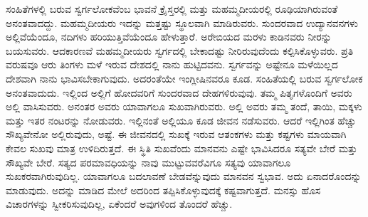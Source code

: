 ಸಂಹಿತೆಗಳಲ್ಲಿ ಬರುವ ಸ್ವರ್ಗಲೋಕವೆಂಬ ಭಾವನೆ ಕ್ರೈಸ್ತರಲ್ಲಿ ಮತ್ತು ಮಹಮ್ಮದೀಯರಲ್ಲಿ ರೂಢಿಯಾಗಿರುವಂತೆ ಅನಂತವಾದದ್ದು. ಮಹಮ್ಮದೀಯರು ಇದನ್ನು ಮತ್ತಷ್ಟು ಸ್ಥೂಲವಾಗಿ ಮಾಡಿರುವರು. ಸುಂದರವಾದ ಉದ್ಯಾನವನಗಳು ಅಲ್ಲಿವೆಯೆಂದೂ, ನದಿಗಳು ಹರಿಯುತ್ತಿವೆಯೆಂದೂ ಹೇಳುತ್ತಾರೆ. ಅರೇಬಿಯದ ಮರಳು ಕಾಡಿನವರು ನೀರನ್ನು ಬಯಸುವರು. ಆದಕಾರಣವೆ ಮಹಮ್ಮದೀಯರು ಸ್ವರ್ಗದಲ್ಲಿ ಬೇಕಾದಷ್ಟು ನೀರಿರುವುದೆಂದು ಕಲ್ಪಿಸಿಕೊಳ್ಳುವರು. ಪ್ರತಿ ವರುಷವೂ ಆರು ತಿಂಗಳು ಮಳೆ ಇರುವ ದೇಶದಲ್ಲಿ ನಾನು ಹುಟ್ಟಿದವನು. ಸ್ವರ್ಗವನ್ನು ಅಷ್ಟೇನೂ ಮಳೆಯಿಲ್ಲದ ದೇಶವಾಗಿ ನಾನು ಭಾವಿಸಬೇಕಾಗುವುದು. ಅದರಂತೆಯೇ ಇಂಗ್ಲೀಷಿನವರೂ ಕೂಡ. ಸಂಹಿತೆಯಲ್ಲಿ ಬರುವ ಸ್ವರ್ಗಲೋಕ ಅನಂತವಾದುದು. ಇಲ್ಲಿಂದ ಅಲ್ಲಿಗೆ ಹೋದವರಿಗೆ ಸುಂದರವಾದ ದೇಹಗಳಿರುವುವು. ತಮ್ಮ ಪಿತೃಗಳೊಂದಿಗೆ ಅವರು ಅಲ್ಲಿ ವಾಸಿಸುವರು. ಅನಂತರ ಅವರು ಯಾವಾಗಲೂ ಸುಖವಾಗಿರುವರು. ಅಲ್ಲಿ ಅವರು ತಮ್ಮ ತಂದೆ, ತಾಯಿ, ಮಕ್ಕಳು ಮತ್ತು ಇತರ ನಂಟರನ್ನು ನೋಡುವರು. ಇಲ್ಲಿನಂತೆ ಅಲ್ಲಿಯೂ ಕೂಡ ಜೀವನ ನಡೆಸುವರು. ಆದರೆ ಇಲ್ಲಿಗಿಂತ ಹೆಚ್ಚು ಸೌಖ್ಯವೇನೋ ಅಲ್ಲಿರುವುದು, ಅಷ್ಟೆ. ಈ ಜೀವನದಲ್ಲಿ ಸುಖಕ್ಕೆ ಇರುವ ಆತಂಕಗಳು ಮತ್ತು ಕಷ್ಟಗಳು ಮಾಯವಾಗಿ ಕೇವಲ ಸುಖವು ಮಾತ್ರ ಉಳಿದಿರುತ್ತದೆ. ಈ ಸ್ಥಿತಿ ಸುಖವೆಂದು ಮಾನವನು ಎಷ್ಟೇ ಭಾವಿಸಿದರೂ ಸತ್ಯವೇ ಬೇರೆ ಮತ್ತು ಸೌಖ್ಯವೇ ಬೇರೆ. ಸತ್ಯದ ಪರಮಾವಧಿಯನ್ನು ನಾವು ಮುಟ್ಟುವವರೆವಿಗೂ ಸತ್ಯವು ಯಾವಾಗಲೂ ಸುಖಕರವಾಗಿರುವುದಿಲ್ಲ. ಯಾವಾಗಲೂ ಬದಲಾವಣೆ ಬೇಡವೆನ್ನುವುದು ಮಾನವನ ಸ್ವಭಾವ. ಅದು ಏನಾದರೊಂದನ್ನು ಮಾಡುವುದು. ಅದನ್ನು ಮಾಡಿದ ಮೇಲೆ ಅದರಿಂದ ತಪ್ಪಿಸಿಕೊಳ್ಳುವುದಕ್ಕೆ ಕಷ್ಟವಾಗುತ್ತದೆ. ಮನಸ್ಸು ಹೊಸ ವಿಚಾರಗಳನ್ನು ಸ್ವೀಕರಿಸುವುದಿಲ್ಲ, ಏಕೆಂದರೆ ಅವುಗಳಿಂದ ತೊಂದರೆ ಹೆಚ್ಚು.

